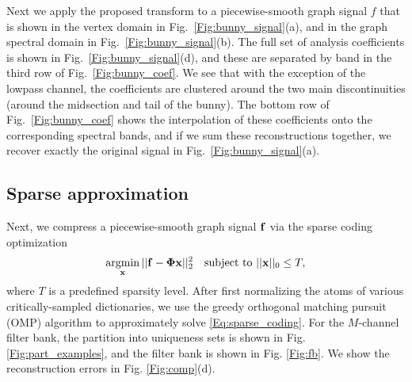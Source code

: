 \documentclass[journal, 10pt]{IEEEtran}
\begin{document}
Next we apply the proposed transform to a piecewise-smooth graph signal $f$ that is shown in the vertex domain in Fig.\ \ref{Fig:bunny_signal}(a), and in the graph spectral domain in Fig.\ \ref{Fig:bunny_signal}(b). The full set of analysis coefficients is shown in Fig.\ \ref{Fig:bunny_signal}(d), and these are separated by band in the third row of Fig.\ \ref{Fig:bunny_coef}. We see that with the exception of the lowpass channel, the coefficients are clustered around the two main discontinuities (around the midsection and tail of the bunny). The bottom row of Fig.\ \ref{Fig:bunny_coef} shows the interpolation of these coefficients onto the corresponding spectral bands, and if we sum these reconstructions together, we recover exactly the original signal in Fig.\ \ref{Fig:bunny_signal}(a).


\subsection{Sparse approximation}
Next, we compress 
a piecewise-smooth graph signal ${\bf f}$ via the sparse coding optimization
\begin{align}\label{Eq:sparse_coding}
\argmin_{\bf x}   || {\bf f}-\boldsymbol{\Phi}{\bf x} ||_2^2 \hbox{~~~subject to } ||{\bf x}||_0 \leq T,
\end{align}
where $T$ is a predefined sparsity level. After first normalizing the atoms of various critically-sampled dictionaries, we use the greedy %
 orthogonal matching pursuit (OMP) algorithm \cite{tropp2004greed,elad_book} to approximately solve \eqref{Eq:sparse_coding}. For the $M$-channel filter bank, the partition into uniqueness sets is shown in Fig. \ref{Fig:part_examples}, and the filter bank is shown in Fig. \ref{Fig:fb}. We show the reconstruction errors in Fig. \ref{Fig:comp}(d). 
\end{document}
